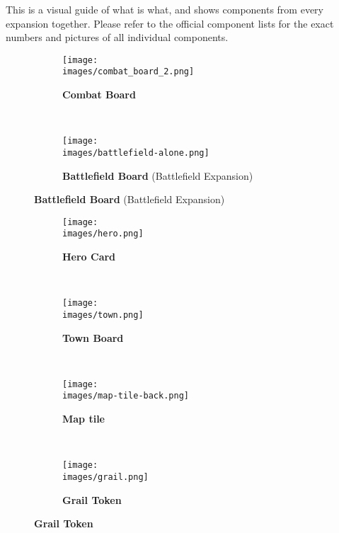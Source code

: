 
This is a visual guide of what is what, and shows components from every expansion together. Please refer to the official component lists for the exact numbers and pictures of all individual components.

\vspace*{-1em}
\begin{figure}[H]
  \centering
  \begin{subfigure}[b]{0.4\linewidth}
    \texttt{[image: \\images/combat\_board\_2.png]}
    \caption{\textbf{Combat Board}}
  \end{subfigure}
  ~
  \begin{subfigure}[b]{0.5\linewidth}
    \texttt{[image: \\images/battlefield-alone.png]}
    \caption{\textbf{Battlefield Board} (Battlefield Expansion)}
  \end{subfigure}
\end{figure}
\vspace*{-1.5em}
\begin{figure}[H]
  \centering
  \begin{subfigure}[b]{0.25\linewidth}
    \texttt{[image: \\images/hero.png]}
    \caption{\textbf{Hero Card}}
  \end{subfigure}
  ~
  \begin{subfigure}[b]{0.25\linewidth}
    \texttt{[image: \\images/town.png]}
    \caption{\textbf{Town Board}}
  \end{subfigure}
  ~
  \begin{subfigure}[b]{0.25\linewidth}
    \centering
    \texttt{[image: \\images/map-tile-back.png]}
    \caption{\textbf{Map tile}}
  \end{subfigure}
  ~
  \begin{subfigure}[b]{0.15\linewidth}
    \centering
    \texttt{[image: \\images/grail.png]}
    \caption{\textbf{Grail Token}}
  \end{subfigure}
\end{figure}
\vspace*{-1.7em}
